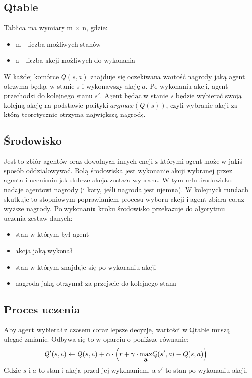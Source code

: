 \documentclass{article}
\begin{document}
\subsection{Qtable}
Tablica ma wymiary m \(\times\) n, gdzie:
\begin{itemize}
    \item m - liczba możliwych stanów
    \item n - liczba akcji możliwych do wykonania 
\end{itemize}

W każdej komórce \(Q(s,a)\) znajduje się oczekiwana wartość nagrody jaką agent otrzyma będąc w stanie \(s\) i wykonawszy akcję \(a\). Po wykonaniu akcji, agent przechodzi do kolejnego stanu \(s'\).
Agent będąc w stanie \(s\) będzie wybierać swoją kolejną akcję na podstawie polityki \(argmax(Q(s))\), czyli wybranie akcji za którą teoretycznie otrzyma największą nagrodę.
\subsection{Środowisko}
Jest to zbiór agentów oraz dowolnych innych encji z którymi agent może w jakiś sposób oddziałowywać. Rolą środowiska jest wykonanie akcji wybranej przez agenta i ocenienie jak dobrze akcja została wybrana. W tym celu środowisko nadaje agentowi nagrody (i kary, jeśli nagroda jest ujemna). W kolejnych rundach skutkuje to stopniowym poprawianiem procesu wyboru akcji i agent zbiera coraz wyższe nagrody. Po wykonaniu kroku środowisko przekazuje do algorytmu uczenia zestaw danych:
\begin{itemize}
    \item stan w którym był agent
    \item akcja jaką wykonał
    \item stan w którym znajduje się po wykonaniu akcji
    \item nagroda jaką otrzymał za przejście do kolejnego stanu
\end{itemize}
\subsection{Proces uczenia}
Aby agent wybierał z czasem coraz lepsze decyzje, wartości w Qtable muszą ulegać zmianie. Odbywa się to w oparciu o poniższe równanie:
\begin{equation}
    Q'(s, a)\leftarrow Q(s, a) + \alpha \cdot\left(r  + \gamma\cdot \stackunder{max}{a}Q(s', a) - Q(s,a) \right) 
\end{equation}
Gdzie \(s\) i \(a\) to stan i akcja przed jej wykonaniem, a  \(s'\) to stan po wykonaniu akcji.
\end{document}
